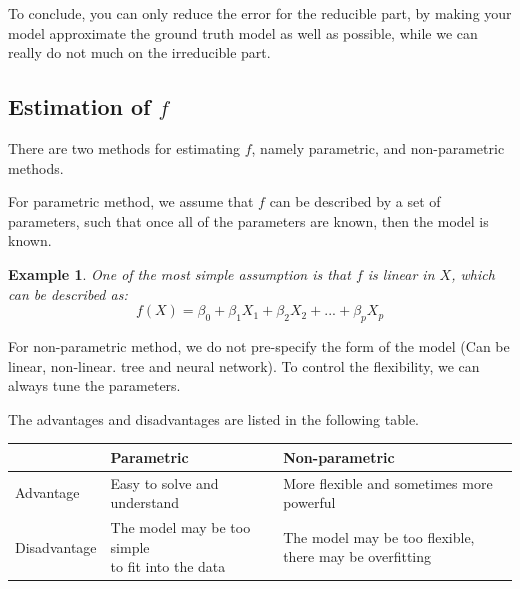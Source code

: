 \documentclass{article}
\theoremstyle{MyNonumberplain}
\theoremstyle{break}
\theoremstyle{break}
\newtheorem{example}{Example}[section]
\theoremstyle{break}
\theoremstyle{break}
\begin{document}
To conclude, you can only reduce the error for the reducible part, by making your model approximate the ground truth model as well as possible, 
while we can really do not much on the irreducible part.

\subsection{Estimation of $f$}

There are two methods for estimating $f$, namely parametric, and non-parametric methods.

For parametric method, we assume that $f$ can be described by a set of parameters, such that once all of the parameters are known, then the model is known.

\begin{expbox}
    \begin{example}
        One of the most simple assumption is that $f$ is linear in $X$, which can be described as:  $$f(X)=\beta_0+\beta_1X_1+\beta_2X_2+...+\beta_pX_p$$
    \end{example}
\end{expbox}

For non-parametric method, we do not pre-specify the form of the model (Can be linear, non-linear. tree and neural network). To 
control the flexibility, we can always tune the parameters.

The advantages and disadvantages are listed in the following table.

\begin{table}[!h]
    \centering
    \begin{tabular}{|l|l|l|}
    \hline
                    & Parametric                                       & Non-parametric                                          \\ \hline
    Advantage    & Easy to solve and understand                     & More flexible and sometimes more powerful               \\ \hline
    Disadvantage & \makecell{The model may be too simple\\ to fit into the data} & \makecell{The model may be too flexible, \\there may be overfitting} \\ \hline
    \end{tabular}
\end{table}
\end{document}
